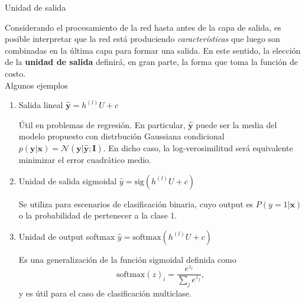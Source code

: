 \documentclass[handout, 9pt]{beamer}
\begin{document}
\begin{frame}{Unidad de salida}

Considerando el procesamiento de la red hasta antes de la capa de salida, es posible interpretar que la red está produciendo \emph{características} que luego son combinadas en la última capa para formar una salida. En este sentido, la elección de la \textbf{unidad de salida} definirá, en gran parte,  la forma que toma la función de costo. \\Algunos ejemplos 
\begin{enumerate}
  \item Salida lineal $\hat{\bm{y}} = h^{(l)}U + c$ \pause

  Útil en problemas de regresión. En particular, $\hat{\bm{y}}$ puede ser la media del modelo propuesto con distrbución Gaussiana condicional $p(\bm{y}|\bm{x}) = \mathcal{N}(\bm{y}|\hat{\bm{y}};\bm{I})$. En dicho caso, la log-verosimilitud será equivalente minimizar el error cuadrático medio. \pause

  \item Unidad de salida sigmoidal $\hat{{y}} = \text{sig}(h^{(l)}U + c)$ \pause

  Se utiliza para escenarios de clasificación binaria, cuyo output es $P(y=1|\bm{x})$ o la probabilidad de pertenecer a la clase 1. \pause

  \item Unidad de output softmax $\hat{{y}} = \text{softmax}(h^{(l)}U + c)$ \pause 

  Es una generalización de la función sigmoidal definida como 
  \begin{equation*}
  \text{softmax}(z)_i = \frac{e^{z_i}}{\sum_{j}e^{z_j}},
  \end{equation*}
  y es útil para el caso de clasificación multiclase. 
\end{enumerate}

\end{frame}



%
\end{document}
